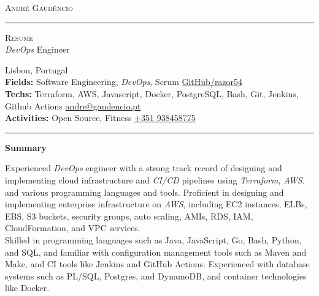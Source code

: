 \documentclass[10pt,A4]{article}
\newcommand{\cvsection}[1]
{
	\begin{center}
		\large\textcolor{sectcol}{\textbf{#1}}
	\end{center}
}
\newcommand{\metasection}[2]
{
\footnotesize{#2} \hspace*{\fill} \footnotesize{#1}\\[1pt]
}
\begin{document}
\pagestyle{fancy}	






\begin{center}
	\HUGE \textsc{André Gaudêncio} \textcolor{sectcol}{\rule[-1mm]{1mm}{0.9cm}} \textsc{Resume}\\[2pt]
	\small \emph{DevOps} Engineer
\end{center}






\metasection{Lisbon, Portugal}{}
\metasection{\href{https://www.github.com/razor54}{GitHub/razor54}}{\textbf{Fields:} Software Engineering, \emph{DevOps}, Scrum} 
\metasection{\href{mailto:andre@gaudencio.pt}{andre@gaudencio.pt}}{\textbf{Techs:} Terraform, AWS, Javascript, Docker, PostgreSQL, Bash, Git, Jenkins, Github Actions}
\metasection{\href{tel:0351938458775}{+351 938458775}}{\textbf{Activities:} Open Source, Fitness}
\vspace{-2pt}
\textcolor{softcol}{\hrule}


\normalsize

\vspace{-6pt}
\cvsection{Summary}

Experienced \emph{DevOps} engineer with a strong track record of designing and implementing cloud infrastructure and \emph{CI/CD} pipelines using \emph{Terraform}, \emph{AWS}, and various programming languages and tools. Proficient in designing and implementing enterprise infrastructure on \emph{AWS}, including EC2 instances, ELBs, EBS, S3 buckets, security groups, auto scaling, AMIs, RDS, IAM, CloudFormation, and VPC services. \\ Skilled in programming languages such as Java, JavaScript, Go, Bash, Python, and SQL, and familiar with configuration management tools such as Maven and Make, and CI tools like Jenkins and GitHub Actions. Experienced with database systems such as PL/SQL, Postgres, and DynamoDB, and container technologies like Docker.
\end{document}

